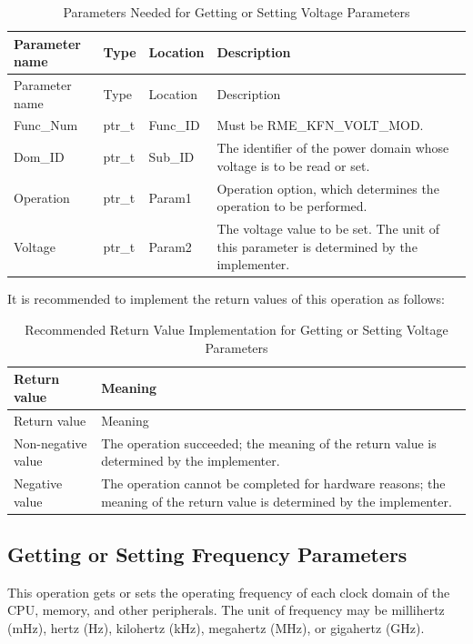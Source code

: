 \begin{xltabular}{\textwidth}{@{}>{\hsize\raggedright\arraybackslash}X>{\hsize\raggedright\arraybackslash}X>{\hsize\raggedright\arraybackslash}X>{\hsize\raggedright\arraybackslash}X@{}}
\caption{Parameters Needed for Getting or Setting Voltage Parameters}\label{tab:8-49-get-or-set-voltage-parameters}\\
\toprule
Parameter name & Type & Location & Description\tabularnewline
\endfirsthead
\toprule
Parameter name & Type & Location & Description\tabularnewline
\midrule
\endhead
\bottomrule
\endlastfoot
Func\_Num & ptr\_t & Func\_ID & Must be RME\_KFN\_VOLT\_MOD.\tabularnewline
Dom\_ID & ptr\_t & Sub\_ID &
The identifier of the power domain whose voltage is to be read or set.\tabularnewline
Operation & ptr\_t & Param1 &
Operation option, which determines the operation to be performed.\tabularnewline
Voltage & ptr\_t & Param2 &
The voltage value to be set. The unit of this parameter is determined by the implementer.\tabularnewline
\end{xltabular}
\nopagebreak[4]

It is recommended to implement the return values of this operation as follows:

\begin{xltabular}{\textwidth}{@{}>{\hsize\raggedright\arraybackslash}X>{\hsize\raggedright\arraybackslash}X@{}}
\caption{Recommended Return Value Implementation for Getting or Setting Voltage Parameters}\label{tab:8-50-get-or-set-voltage-suggested-return-values}\\
\toprule
Return value & Meaning\tabularnewline
\endfirsthead
\toprule
Return value & Meaning\tabularnewline
\midrule
\endhead
\bottomrule
\endlastfoot
    Non-negative value & The operation succeeded; the meaning of the return value is determined by the implementer.\tabularnewline
    Negative value & The operation cannot be completed for hardware reasons; the meaning of the return value is determined by the implementer.\tabularnewline
\end{xltabular}
\nopagebreak[4]

\subsection{Getting or Setting Frequency Parameters}\label{subsec:8-get-or-set-frequency}

This operation gets or sets the operating frequency of each clock domain of the CPU, memory, and other peripherals. The unit of frequency may be millihertz (mHz), hertz (Hz), kilohertz (kHz), megahertz (MHz), or gigahertz (GHz).

